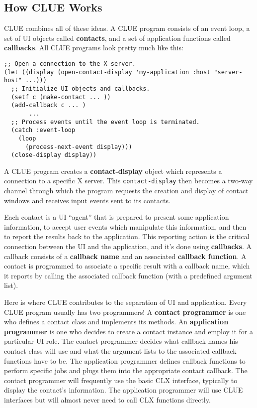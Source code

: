 \subsection{How CLUE Works\label{sec:how-clue-works}} 
CLUE combines all of these ideas. A CLUE program consists of an event loop, a
set of UI objects called {\bf contacts}, and a set of application functions
called {\bf callbacks}. All CLUE programs look pretty much like this:

\begin{verbatim}
;; Open a connection to the X server.
(let ((display (open-contact-display 'my-application :host "server-host" ...)))
  ;; Initialize UI objects and callbacks.  
  (setf c (make-contact ... ))
  (add-callback c ... )
       ...
  ;; Process events until the event loop is terminated.
  (catch :event-loop
    (loop
      (process-next-event display)))  
  (close-display display))
\end{verbatim}

A CLUE program creates a {\bf contact-display} object which
represents a connection to a specific X server.  This {\tt contact-display} then
becomes a two-way channel through which the program requests the creation and
display of contact windows and receives input events sent to its contacts. 

Each contact is a UI ``agent'' that is prepared to present some
application information, to accept user
events which manipulate this information, and then to report the results back to
the application. This reporting action is the critical connection between the UI
and the application, and it's done using {\bf callbacks}.
A callback consists of
a {\bf callback name} and an associated {\bf callback function}. A contact is programmed
to associate a specific result with a callback name, which it reports by calling
the associated callback function (with a predefined argument list). 

Here is where CLUE contributes to the separation of UI and application. 
Every
CLUE program usually has two programmers! A {\bf contact programmer} is one
who defines a contact class and implements its methods. An {\bf application
programmer} is one who decides to create a contact instance and employ it for a
particular UI role. The contact programmer decides what callback names his
contact class will use and what the argument lists to the associated callback
functions have to be. The application programmer defines callback functions to
perform specific jobs and plugs them into the appropriate contact callback.
The contact programmer will frequently use the basic CLX interface, typically to
display the contact's information. The application programmer will use CLUE
interfaces but will almost never need to call CLX functions directly.

